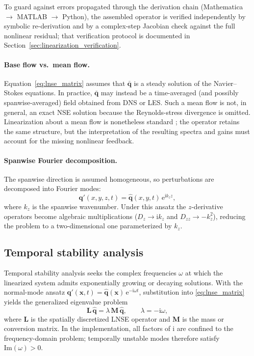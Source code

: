 \documentclass[11pt]{article}
\newcommand{\bq}{\mathbf{q}}
\newcommand{\bqp}{\mathbf{q}'}
\newcommand{\bqbar}{\bar{\mathbf{q}}}
\newcommand{\bx}{\mathbf{x}}
\newcommand{\bL}{\mathbf{L}}
\newcommand{\bM}{\mathbf{M}}
\begin{document}
To guard against errors propagated through the derivation chain
(Mathematica $\rightarrow$ MATLAB $\rightarrow$ Python), the assembled operator
is verified independently by symbolic re-derivation and by a complex-step
Jacobian check against the full nonlinear residual; that verification protocol
is documented in Section~\ref{sec:linearization_verification}.

\paragraph{Base flow vs.\ mean flow.}
Equation~\eqref{eq:lnse_matrix} assumes that $\bqbar$ is a steady solution of
the Navier--Stokes equations. In practice, $\bqbar$ may instead be a
time-averaged (and possibly spanwise-averaged) field obtained from DNS or LES.
Such a mean flow is not, in general, an exact NSE solution because the
Reynolds-stress divergence is omitted. Linearization about a mean flow is
nonetheless standard \citep{mettot2014computation}; the operator retains the
same structure, but the interpretation of the resulting spectra and gains must
account for the missing nonlinear feedback.

\paragraph{Spanwise Fourier decomposition.}
The spanwise direction is assumed homogeneous, so perturbations are decomposed
into Fourier modes:
\begin{equation}
  \bqp(x,y,z,t) = \hat{\bq}(x,y,t)\,\mathrm{e}^{\mathrm{i}k_z z},
  \label{eq:spanwise_fourier}
\end{equation}
where $k_z$ is the spanwise wavenumber. Under this ansatz the $z$-derivative
operators become algebraic multiplications
($D_z \rightarrow \mathrm{i}k_z$ and $D_{zz} \rightarrow -k_z^2$), reducing the
problem to a two-dimensional one parameterized by $k_z$.

\subsection{Temporal stability analysis}
\label{sec:temporal}

Temporal stability analysis seeks the complex frequencies $\omega$ at which the
linearized system admits exponentially growing or decaying solutions. With the
normal-mode ansatz
$\bqp(\bx,t) = \hat{\bq}(\bx)\,\mathrm{e}^{-\mathrm{i}\omega t}$,
substitution into \eqref{eq:lnse_matrix} yields the generalized eigenvalue
problem
\begin{equation}
  \bL\,\hat{\bq} = \lambda\,\bM\,\hat{\bq},
  \qquad
  \lambda = -\mathrm{i}\omega,
  \label{eq:gevp}
\end{equation}
where $\bL$ is the spatially discretized LNSE operator and $\bM$ is the mass
or conversion matrix. In the implementation, all factors of $\mathrm{i}$ are
confined to the frequency-domain problem; temporally unstable modes therefore
satisfy $\mathrm{Im}(\omega) > 0$.
\end{document}
